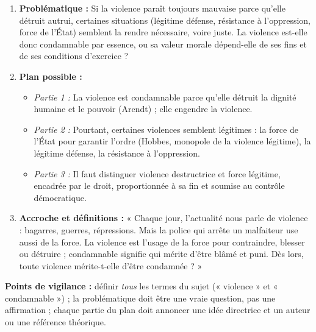\documentclass[11pt]{article}
\begin{document}
\begin{corrige}
\begin{enumerate}
\item \textbf{Problématique :} Si la violence paraît toujours mauvaise parce qu'elle détruit autrui, certaines situations (légitime défense, résistance à l'oppression, force de l'État) semblent la rendre nécessaire, voire juste. La violence est-elle donc condamnable par essence, ou sa valeur morale dépend-elle de ses fins et de ses conditions d'exercice ?
\item \textbf{Plan possible :}
\begin{itemize}
\item \emph{Partie 1 :} La violence est condamnable parce qu'elle détruit la dignité humaine et le pouvoir (Arendt) ; elle engendre la violence.
\item \emph{Partie 2 :} Pourtant, certaines violences semblent légitimes : la force de l'État pour garantir l'ordre (Hobbes, monopole de la violence légitime), la légitime défense, la résistance à l'oppression.
\item \emph{Partie 3 :} Il faut distinguer violence destructrice et force légitime, encadrée par le droit, proportionnée à sa fin et soumise au contrôle démocratique.
\end{itemize}
\item \textbf{Accroche et définitions :} « Chaque jour, l'actualité nous parle de violence : bagarres, guerres, répressions. Mais la police qui arrête un malfaiteur use aussi de la force. La violence est l'usage de la force pour contraindre, blesser ou détruire ; condamnable signifie qui mérite d'être blâmé et puni. Dès lors, toute violence mérite-t-elle d'être condamnée ? »
\end{enumerate}
\textbf{Points de vigilance :} définir \emph{tous} les termes du sujet (« violence » et « condamnable ») ; la problématique doit être une vraie question, pas une affirmation ; chaque partie du plan doit annoncer une idée directrice et un auteur ou une référence théorique.
\end{corrige}
\end{document}
